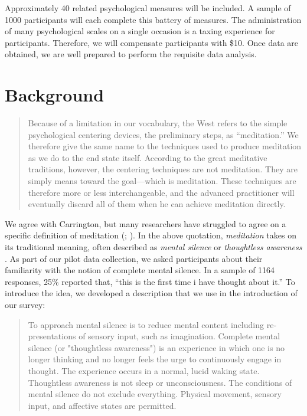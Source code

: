 \documentclass[12pt]{article}
\begin{document}
Approximately 40 related psychological measures will be included.
A sample of 1000 participants will each complete this battery of measures.
The administration of many psychological scales on a single occasion
is a taxing experience for participants. 
Therefore, we will compensate participants with \$10.
Once data are obtained,
we are well prepared to perform the requisite data analysis.

\section{Background}

\begin{quotation}
\noindent Because of a limitation in our vocabulary, the West refers to the simple
psychological centering devices, the preliminary steps, as ``meditation.''
We therefore give the same name to the techniques used to produce
meditation as we do to the end state itself. According to the great
meditative traditions, however, the centering techniques are not
meditation. They are simply means toward the goal---which is meditation.
These techniques are therefore more or less interchangeable, and the
advanced practitioner will eventually discard all of them when he can
achieve meditation directly. \cite[pp.~8--9]{carrington1977}
\end{quotation}

We agree with Carrington, but many
researchers have struggled to agree on a specific
definition of meditation (;
).
In the above quotation, \emph{meditation} takes on its traditional meaning,
often described as \emph{mental silence} or \emph{thoughtless awareness} \cite{manocha2008}.
As part of our pilot data collection,
we asked participants about their familiarity with the notion of complete mental silence.
In a sample of 1164 responses,
25\% reported that, ``this is the first time i have thought about it.''
To introduce the idea, we developed a description that we use
in the introduction of our survey:

\begin{quotation}
\noindent To approach mental silence is to reduce mental content including
re­presentations of sensory input, such as imagination. Complete
mental silence (or "thoughtless awareness") is an experience in which
one is no longer thinking and no longer feels the urge to continuously
engage in thought. The experience occurs in a normal, lucid waking
state. Thoughtless awareness is not sleep or unconsciousness. The
conditions of mental silence do not exclude everything. Physical
movement, sensory input, and affective states are permitted.
\end{quotation}
\end{document}

